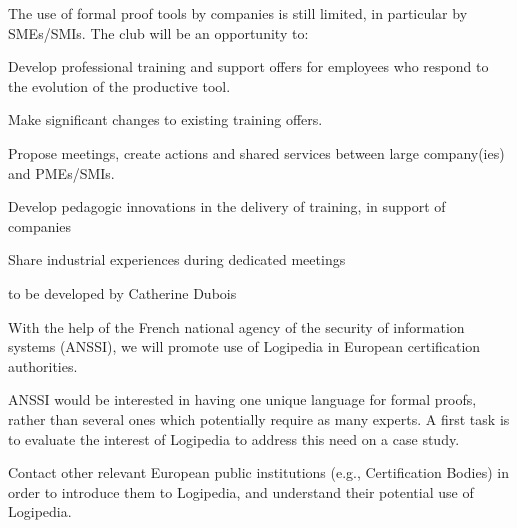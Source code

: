 \begin{workpackage}[id=dissemination,type=MGT,
  short={Dissemination},
  title={Dissemination, communication and exploitation},
  lead=Inr,InrRM=12,BirRM=4,IrtRM=4,ImtRM=2,StrRM=2,ZibRM=14,EduRM=12]
\begin{tasklist}
  \begin{task}[id=industrial-club,
    title=Expanding the use of Logipedia in the industry,
    lead=Irt,IrtRM=2,wphases=7-42!.1]
    The use of formal proof tools by companies is still limited, in particular by SMEs/SMIs. The club will be an opportunity to:
    \begin{compactitem}
    \item Develop professional training and support offers for employees who respond to the evolution of the productive tool.
    \item Make significant changes to existing training offers.
    \item Propose meetings, create actions and shared services between large company(ies) and PMEs/SMIs.
    \item Develop pedagogic innovations in the delivery of training, in support of companies
    \item Share industrial experiences during dedicated meetings
    \end{compactitem}
  \end{task}

  \begin{task}[id=certifiers-club,
      title=Promoting the use of Logipedia by certification
      authorities, lead=Imt,ImtRM=2,wphases=7-42!.05]

    {\color{red} to be developed by Catherine Dubois}
    
    With the help of the French national agency of the security of
    information systems (ANSSI), we will promote use of Logipedia in
    European certification authorities.
    
    \begin{compactitem}
    \item  ANSSI would be interested in having one unique language for formal
proofs, rather than several ones which potentially require as many
experts. A first task is to evaluate the interest of Logipedia to address
this need on a case study. 
\item Contact other relevant European public institutions
(e.g., Certification Bodies) in order to introduce them to Logipedia,
and understand their potential use of Logipedia. 
    \end{compactitem}
  \end{task}


\end{tasklist}
\end{workpackage}
